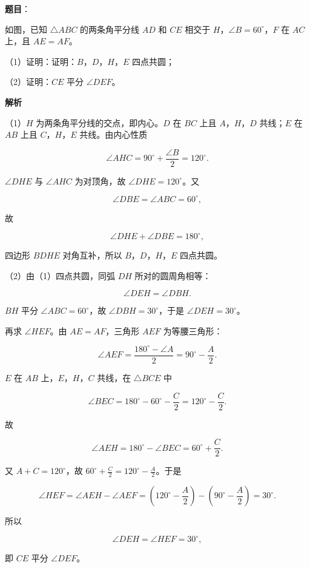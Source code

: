 \begin{answer}

\textbf{题目}：

如图，已知 $\triangle ABC$ 的两条角平分线 $AD$ 和 $CE$ 相交于 $H$，$\angle B=60^\circ$，$F$ 在 $AC$ 上，且 $AE=AF$。

（1）证明：证明：$B$，$D$，$H$，$E$ 四点共圆；

（2）证明：$CE$ 平分 $\angle DEF$。
\nopagebreak[4]
\begin{center}\end{center}
\nopagebreak[4]
\textbf{解析}

（1）$H$ 为两条角平分线的交点，即内心。$D$ 在 $BC$ 上且 $A$，$H$，$D$ 共线；$E$ 在 $AB$ 上且 $C$，$H$，$E$ 共线。由内心性质

\nopagebreak[4]
\[\angle AHC=90^\circ+\frac{\angle B}{2}=120^\circ .\]

$\angle DHE$ 与 $\angle AHC$ 为对顶角，故 $\angle DHE=120^\circ$。又

\nopagebreak[4]
\[\angle DBE=\angle ABC=60^\circ,\]

故

\nopagebreak[4]
\[\angle DHE+\angle DBE=180^\circ,\]

四边形 $B D H E$ 对角互补，所以 $B$，$D$，$H$，$E$ 四点共圆。

（2）由（1）四点共圆，同弧 $DH$ 所对的圆周角相等：

\nopagebreak[4]
\[\angle DEH=\angle DBH .\]

$BH$ 平分 $\angle ABC=60^\circ$，故 $\angle DBH=30^\circ$，于是 $\angle DEH=30^\circ$。

再求 $\angle HEF$。由 $AE=AF$，三角形 $AEF$ 为等腰三角形：

\nopagebreak[4]
\[\angle AEF=\frac{180^\circ-\angle A}{2}=90^\circ-\frac A2 .\]

$E$ 在 $AB$ 上，$E$，$H$，$C$ 共线，在 $\triangle BCE$ 中

\nopagebreak[4]
\[\angle BEC=180^\circ-60^\circ-\frac C2=120^\circ-\frac C2 .\]

故

\nopagebreak[4]
\[\angle AEH=180^\circ-\angle BEC=60^\circ+\frac C2 .\]

又 $A+C=120^\circ$，故 $60^\circ+\frac C2=120^\circ-\frac A2$。于是

\nopagebreak[4]
\[\angle HEF=\angle AEH-\angle AEF
=\left(120^\circ-\frac A2\right)-\left(90^\circ-\frac A2\right)=30^\circ .\]

所以

\nopagebreak[4]
\[\angle DEH=\angle HEF=30^\circ,\]

即 $CE$ 平分 $\angle DEF$。


\end{answer}
